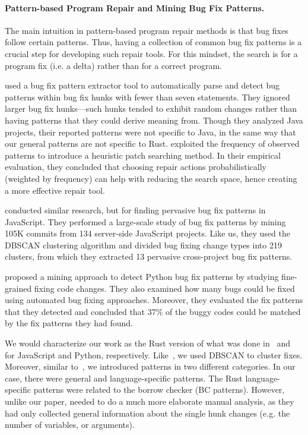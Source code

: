 \paragraph{Pattern-based Program Repair and Mining Bug Fix Patterns.}
The main intuition in pattern-based program repair methods is that bug fixes follow certain patterns. Thus, having a collection of common bug fix patterns is a crucial step for developing such repair tools. For this mindset, the search is for a program fix (i.e. a delta) rather than for a correct program.

\cite{pan2009toward} used a bug fix pattern extractor tool to automatically parse and detect bug patterns within bug fix hunks with fewer than seven statements. They ignored larger bug fix hunks---such hunks tended to exhibit random changes rather than having patterns that they could derive meaning from. Though they analyzed Java projects, their reported patterns were not specific to Java, in the same way that our general patterns are not specific to Rust. \cite{martinez2015mining,martinez2012mining} exploited the frequency of observed patterns to introduce a heuristic patch searching method. In their empirical evaluation, they concluded that choosing repair actions probabilistically (weighted by frequency) can help with reducing the search space, hence creating a more effective repair tool.

\cite{hanam2016discovering} conducted similar research, but for finding pervasive bug fix patterns in JavaScript. They performed a large-scale study of bug fix patterns by mining 105K commits from 134 server-side JavaScript projects. Like us, they used the DBSCAN clustering algorithm and divided bug fixing change types into 219 clusters, from which they extracted 13 pervasive cross-project bug fix patterns. 

\cite{yang2022mining} proposed a mining approach to detect Python bug fix patterns by studying fine-grained fixing code changes. They also examined how many bugs could be fixed using automated bug fixing approaches. Moreover, they evaluated the fix patterns that they detected and concluded that 37\% of the buggy codes could be matched by the fix patterns they had found. 

We would characterize our work as the Rust version of what was done in~\cite{hanam2016discovering} and~\cite{yang2022mining} for JavaScript and Python, respectively. Like~\cite{hanam2016discovering}, we used DBSCAN to cluster fixes. Moreover, similar to~\cite{yang2022mining}, we introduced patterns in two different categories. In our case, there were general and language-specific patterns. The Rust language-specific patterns were related to the borrow checker (BC patterns). However, unlike our paper, \cite{yang2022mining} needed to do a much more elaborate manual analysis, as they had only collected general information about the single hunk changes (e.g. the number of variables, or arguments).

